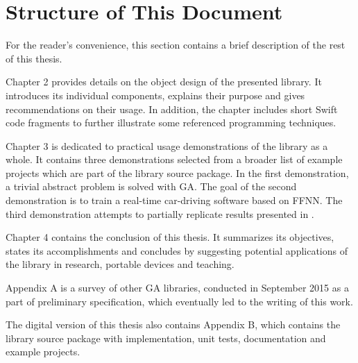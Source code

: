 \section{Structure of This Document}
For the reader's convenience, this section contains a brief description of the rest of this thesis.

Chapter 2 provides details on the object design of the presented library. It introduces its individual components, explains their purpose and gives recommendations on their usage. In addition, the chapter includes short Swift code fragments to further illustrate some referenced programming techniques.

Chapter 3 is dedicated to practical usage demonstrations of the library as a whole. It contains three demonstrations selected from a broader list of example projects which are part of the library source package. In the first demonstration, a trivial abstract problem is solved with GA. The goal of the second demonstration is to train a real-time car-driving software based on FFNN. The third demonstration attempts to partially replicate results presented in \cite{EvolvingQwopGaits}.

Chapter 4 contains the conclusion of this thesis. It summarizes its objectives, states its accomplishments and concludes by suggesting potential applications of the library in research, portable devices and teaching.

Appendix A is a survey of other GA libraries, conducted in September 2015 as a part of preliminary specification, which eventually led to the writing of this work.

The digital version of this thesis also contains Appendix B, which contains the library source package with implementation, unit tests, documentation and example projects.
